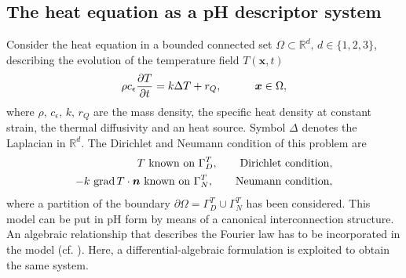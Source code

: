 \subsection{The heat equation as a pH descriptor system}\label{sec:phheat}
Consider the heat equation in a bounded connected set $\Omega \subset \mathbb{R}^d, \, d \in \{1,2,3\}$, describing the evolution of the temperature field $T(\bm{x}, t)$
\begin{equation}\label{eq:heatEq}
\rho c_\epsilon \diffp{T}{t} = k \Delta T + r_Q, \qquad \quad \bm{x} \in \Omega,
\end{equation}
where $\rho,\, c_\epsilon,\, k,\, r_Q$ are the mass density, the specific heat density at constant strain, the thermal diffusivity and an heat source. Symbol $\Delta$ denotes the Laplacian in $\mathbb{R}^d$. The Dirichlet and Neumann condition of this problem are 
\begin{equation*}
	\begin{aligned}
	T \text{ known on } \Gamma_D^T, \qquad \text{Dirichlet condition}, \\
	-k \, \operatorname*{grad} T \cdot \bm{n} \text{ known on } \Gamma_N^T, \qquad \text{Neumann condition},
	\end{aligned}
\end{equation*}
where a partition of the boundary $\partial \Omega = \Gamma_D^T \cup \Gamma_N^T$ has been considered. This model can be put in pH form by means of a canonical interconnection structure. An algebraic relationship that describes the Fourier law has to be incorporated in the model (cf. \cite[Chapter 2]{kotyczka2019numerical}). Here, a differential-algebraic formulation is exploited to obtain the same system. \\

